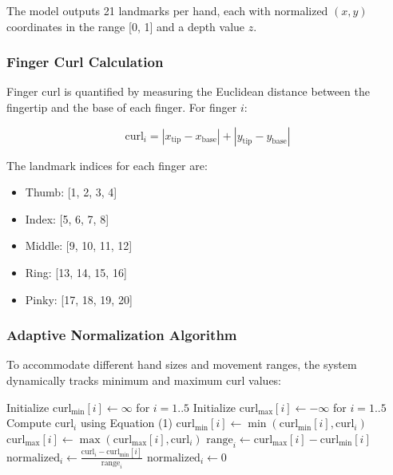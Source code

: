 \documentclass[12pt]{article}
\begin{document}
The model outputs 21 landmarks per hand, each with normalized $(x, y)$ coordinates in the range [0, 1] and a depth value $z$.

\subsubsection{Finger Curl Calculation}

Finger curl is quantified by measuring the Euclidean distance between the fingertip and the base of each finger. For finger $i$:

\begin{equation}
    \text{curl}_i = |x_{\text{tip}} - x_{\text{base}}| + |y_{\text{tip}} - y_{\text{base}}|
\end{equation}

The landmark indices for each finger are:
\begin{itemize}
    \item Thumb: [1, 2, 3, 4]
    \item Index: [5, 6, 7, 8]
    \item Middle: [9, 10, 11, 12]
    \item Ring: [13, 14, 15, 16]
    \item Pinky: [17, 18, 19, 20]
\end{itemize}

\subsubsection{Adaptive Normalization Algorithm}

To accommodate different hand sizes and movement ranges, the system dynamically tracks minimum and maximum curl values:

\begin{algorithm}[H]
\caption{Adaptive Normalization}
\begin{algorithmic}[1]
\State Initialize $\text{curl}_{\min}[i] \gets \infty$ for $i = 1..5$
\State Initialize $\text{curl}_{\max}[i] \gets -\infty$ for $i = 1..5$
\State
{}
        \State Compute $\text{curl}_i$ using Equation (1)
        \State $\text{curl}_{\min}[i] \gets \min(\text{curl}_{\min}[i], \text{curl}_i)$
        \State $\text{curl}_{\max}[i] \gets \max(\text{curl}_{\max}[i], \text{curl}_i)$
        \State $\text{range}_i \gets \text{curl}_{\max}[i] - \text{curl}_{\min}[i]$
            \State $\text{normalized}_i \gets \frac{\text{curl}_i - \text{curl}_{\min}[i]}{\text{range}_i}$
        \Else
            \State $\text{normalized}_i \gets 0$
        \EndIf
    \EndFor
\EndFor
\end{algorithmic}
\end{algorithm}
\end{document}
